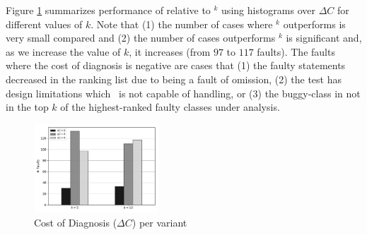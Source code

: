 \documentclass{article}
\begin{document}
Figure \ref{fig:diagnosis} summarizes performance of 
relative to \sfl{}$^{k}$ using histograms over $\Delta{}C$ for
different values of $k$. Note that (1) the number of cases where
\sfl{}$^{k}$ outperforms  is very small compared and (2)
the number of cases  outperforms \sfl{}$^{k}$ is
significant and, as we increase the value of $k$, it increases (from
$97$ to $117$ faults). The faults where the cost of diagnosis is
negative are cases that (1) the faulty statements decreased in the ranking 
list due to being a fault of omission, (2) the test has design limitations
which \ds~is not capable of handling, or (3) the buggy-class in not in
the top $k$ of the highest-ranked faulty classes under analysis.


\begin{figure}[h]
	\vspace{-0.3cm}
		\centering
		\includegraphics[width=0.415\textwidth]{figures/performance.pdf}
		\vspace{-0.4cm}
		\caption{Cost of Diagnosis ($\Delta{}C$) per variant}
		\label{fig:diagnosis}
\end{figure}
\end{document}
